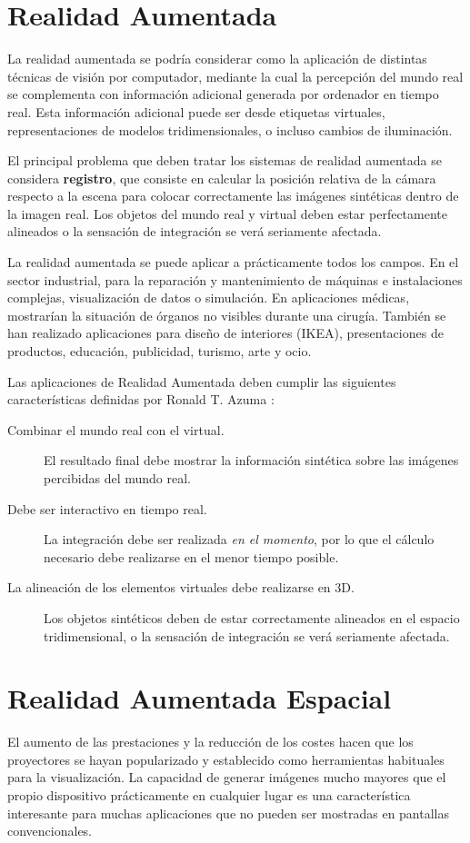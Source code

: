 \section{Realidad Aumentada}

La realidad aumentada se podría considerar como la aplicación de distintas técnicas de visión por computador, mediante la cual la percepción del mundo real se complementa con información adicional generada por ordenador en tiempo real. Esta información adicional puede ser desde etiquetas virtuales, representaciones de modelos tridimensionales, o incluso cambios de iluminación. 

El principal problema que deben tratar los sistemas de realidad aumentada se considera \textbf{registro}, que consiste en calcular la posición relativa de la cámara respecto a la escena para colocar correctamente las imágenes sintéticas dentro de la imagen real. Los objetos del mundo real y virtual deben estar perfectamente alineados o la sensación de integración se verá seriamente afectada.

La realidad aumentada se puede aplicar a prácticamente todos los campos. En el sector industrial, para la reparación y mantenimiento de máquinas e instalaciones complejas, visualización de datos o simulación.  En aplicaciones médicas, mostrarían la situación de órganos no visibles durante una cirugía. También se han realizado aplicaciones para diseño de interiores (IKEA), presentaciones de productos, educación, publicidad, turismo, arte y ocio. 

Las aplicaciones de Realidad Aumentada deben cumplir las siguientes características definidas por Ronald T. Azuma \cite{Azuma}:

\begin{description}
\item[Combinar el mundo real con el virtual.] El resultado final debe mostrar la información sintética sobre las imágenes percibidas del mundo real.
\item[Debe ser interactivo en tiempo real.] La integración debe ser realizada \emph{en el momento}, por lo que el cálculo necesario debe realizarse en el menor tiempo posible.
\item[La alineación de los elementos virtuales debe realizarse en 3D.] Los objetos sintéticos deben de estar correctamente alineados en el espacio tridimensional,  o la sensación de integración se verá seriamente afectada.
\end{description}

\section{Realidad Aumentada Espacial}
  El aumento de las prestaciones y la reducción de los costes hacen que los proyectores se hayan popularizado y establecido como herramientas habituales para la visualización. La capacidad de generar imágenes mucho mayores que el propio dispositivo prácticamente en cualquier lugar es una característica interesante para muchas aplicaciones que no pueden ser mostradas en pantallas convencionales. 

